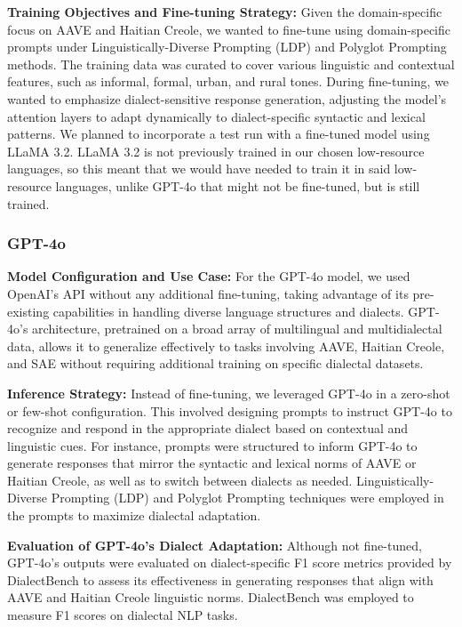 \textbf{Training Objectives and Fine-tuning Strategy:} Given the domain-specific focus on AAVE and Haitian Creole, we wanted to fine-tune using domain-specific prompts under Linguistically-Diverse Prompting (LDP) and Polyglot Prompting methods. The training data was curated to cover various linguistic and contextual features, such as informal, formal, urban, and rural tones. During fine-tuning, we wanted to emphasize dialect-sensitive response generation, adjusting the model’s attention layers to adapt dynamically to dialect-specific syntactic and lexical patterns. We planned to incorporate a test run with a fine-tuned model using LLaMA 3.2. LLaMA 3.2 is not previously trained in our chosen low-resource languages, so this meant that we would have needed to train it in said low-resource languages, unlike GPT-4o that might not be fine-tuned, but is still trained.

\subsubsection{GPT-4o}

\textbf{Model Configuration and Use Case:} For the GPT-4o model, we used OpenAI’s API without any additional fine-tuning, taking advantage of its pre-existing capabilities in handling diverse language structures and dialects. GPT-4o's architecture, pretrained on a broad array of multilingual and multidialectal data, allows it to generalize effectively to tasks involving AAVE, Haitian Creole, and SAE without requiring additional training on specific dialectal datasets.

\textbf{Inference Strategy:} Instead of fine-tuning, we leveraged GPT-4o in a zero-shot or few-shot configuration. This involved designing prompts to instruct GPT-4o to recognize and respond in the appropriate dialect based on contextual and linguistic cues. For instance, prompts were structured to inform GPT-4o to generate responses that mirror the syntactic and lexical norms of AAVE or Haitian Creole, as well as to switch between dialects as needed. Linguistically-Diverse Prompting (LDP) and Polyglot Prompting techniques were employed in the prompts to maximize dialectal adaptation.


\textbf{Evaluation of GPT-4o’s Dialect Adaptation:} Although not fine-tuned, GPT-4o’s outputs were evaluated on dialect-specific F1 score metrics provided by DialectBench \cite{Faisal:24} to assess its effectiveness in generating responses that align with AAVE and Haitian Creole linguistic norms. DialectBench was employed to measure F1 scores on dialectal NLP tasks.

